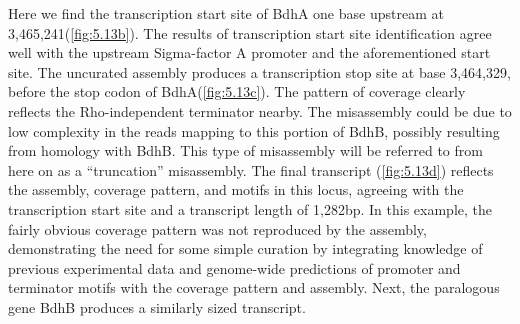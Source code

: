 Here we find the transcription start site of BdhA one base upstream at 3,465,241(\ref{fig:5.13b}). The results of transcription start site identification agree well with the upstream Sigma-factor A promoter and the aforementioned start site. The uncurated assembly produces a transcription stop site at base 3,464,329, before the stop codon of BdhA(\ref{fig:5.13c}). The pattern of coverage clearly reflects the Rho-independent terminator nearby. The misassembly could be due to low complexity in the reads mapping to this portion of BdhB, possibly resulting from homology with BdhB. This type of misassembly will be referred to from here on as a ``truncation'' misassembly. The final transcript (\ref{fig:5.13d}) reflects the assembly, coverage pattern, and motifs in this locus, agreeing with the transcription start site and a transcript length of 1,282bp. In this example, the fairly obvious coverage pattern was not reproduced by the assembly, demonstrating the need for some simple curation by integrating knowledge of previous experimental data and genome-wide predictions of promoter and terminator motifs with the coverage pattern and assembly. Next, the paralogous gene BdhB produces a similarly sized transcript.
